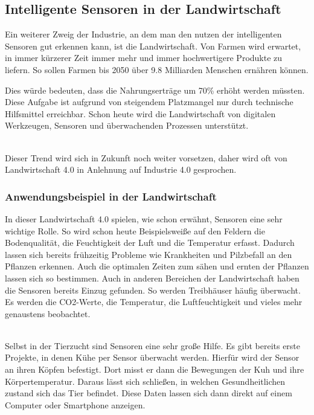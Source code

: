 \documentclass[a4paper,12pt]{scrartcl}
\begin{document}
\newpage
\subsection{Intelligente Sensoren in der Landwirtschaft}
Ein weiterer Zweig der Industrie, an dem man den nutzen der intelligenten Sensoren gut erkennen kann, ist die Landwirtschaft. 
Von Farmen wird erwartet, in immer kürzerer Zeit immer mehr und immer hochwertigere Produkte zu liefern. So sollen Farmen bis 2050 über 9.8 Milliarden Menschen ernähren können.
\cite[Seite 21]{King.2017}

Dies würde bedeuten, dass die Nahrungserträge um 70\% erhöht werden müssten. \cite[Seite 1]{Navulur.2017}
Diese Aufgabe ist aufgrund von steigendem Platzmangel nur durch technische Hilfsmittel erreichbar. Schon heute wird die Landwirtschaft von digitalen Werkzeugen, Sensoren und überwachenden Prozessen unterstützt.

\cite[Seite 1]{RaminShamshiri.2018}\\

Dieser Trend wird sich in Zukunft noch weiter vorsetzen, daher wird oft von Landwirtschaft 4.0 in Anlehnung auf Industrie 4.0 gesprochen.

\subsubsection{Anwendungsbeispiel in der Landwirtschaft}
In dieser Landwirtschaft 4.0 spielen, wie schon erwähnt, Sensoren eine sehr wichtige Rolle. So wird schon heute Beispielsweiße auf den Feldern die Bodenqualität, die Feuchtigkeit der Luft und die Temperatur erfasst. Dadurch lassen sich bereits frühzeitig Probleme wie Krankheiten und Pilzbefall an den Pflanzen erkennen. Auch die optimalen Zeiten zum sähen und ernten der Pflanzen lassen sich so bestimmen. Auch in anderen Bereichen der Landwirtschaft haben die Sensoren bereits Einzug gefunden. So werden Treibhäuser häufig überwacht. Es werden die CO2-Werte, die Temperatur, die Luftfeuchtigkeit und vieles mehr genaustens beobachtet.

\cite[Seite 2]{Navulur.2017}\\


Selbst in der Tierzucht sind Sensoren eine sehr große Hilfe. Es gibt bereits erste Projekte, in denen Kühe per Sensor überwacht werden. Hierfür wird der Sensor an ihren Köpfen befestigt. Dort misst er dann die Bewegungen der Kuh und ihre Körpertemperatur. Daraus lässt sich schließen, in welchen Gesundheitlichen zustand sich das Tier befindet. Diese Daten lassen sich dann direkt auf einem Computer oder Smartphone anzeigen.
\end{document}
